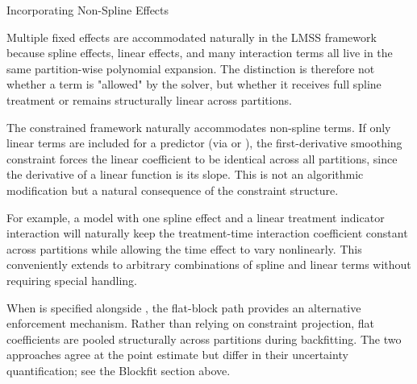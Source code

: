 \begin{Section}{Incorporating Non-Spline Effects}


Multiple fixed effects are accommodated naturally in the LMSS framework
because spline effects, linear effects, and many interaction terms all live
in the same partition-wise polynomial expansion. The distinction is therefore
not whether a term is "allowed" by the solver, but whether it receives full
spline treatment or remains structurally linear across partitions.

The constrained framework naturally accommodates non-spline terms. If only
linear terms are included for a predictor (via
 or
), the first-derivative smoothing
constraint forces the linear coefficient to be identical across all
partitions, since the derivative of a linear function is its slope. This
is not an algorithmic modification but a natural consequence of the
constraint structure.

For example, a model with one spline effect and a linear treatment indicator
interaction will naturally keep the treatment-time interaction coefficient
constant across partitions while allowing the time effect to vary
nonlinearly. This conveniently extends to arbitrary combinations of spline
and linear terms without requiring special handling.

When  is specified alongside
, the flat-block path provides an
alternative enforcement mechanism. Rather than relying on constraint
projection, flat coefficients are pooled structurally across partitions
during backfitting. The two approaches agree at the point estimate but
differ in their uncertainty quantification; see the Blockfit section above.
\end{Section}
%
